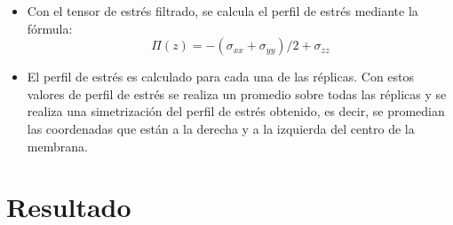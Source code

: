 \documentclass[12pt]{article}
\begin{document}
\begin{itemize}
\item Con el tensor de estrés filtrado, se calcula el perfil de estrés mediante la fórmula:
\begin{equation}
\Pi (z)=-(\sigma_{xx}+\sigma_{yy})/2+\sigma_{zz}
\end{equation}
\item El perfil de estrés es calculado para cada una de las réplicas. Con estos valores de perfil de estrés se realiza un promedio sobre todas las réplicas y se realiza una simetrización del perfil de estrés obtenido, es decir, se promedian las coordenadas que están a la derecha y a la izquierda del centro de la membrana.\\
\end{itemize}
\section{Resultado}
\end{document}
